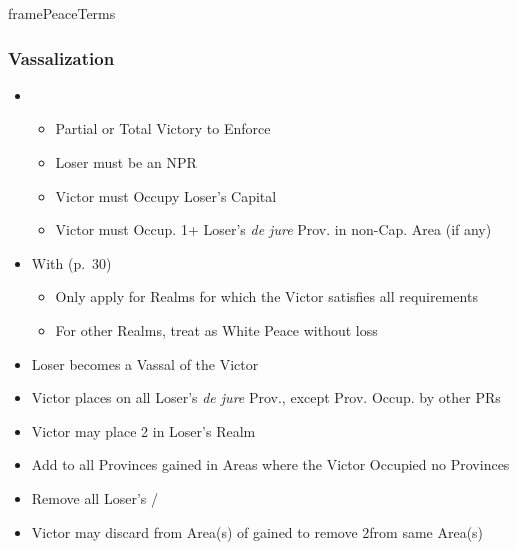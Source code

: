 \documentclass[10pt]{article}
\begin{document}
\begin{dynamiccontents*}{framePeaceTerms}
\begin{multicols}{3}
		\subsubsection*{Vassalization}
		\begin{itemize}
			\item {}
			\begin{itemize}
				\item Partial or Total Victory to Enforce
				\item Loser must be an NPR
				\item Victor must Occupy Loser's Capital
				\item Victor must Occup. 1+ Loser's \emph{de jure} Prov. in non-Cap. Area (if any)
			\end{itemize}
			\item With  (p.~30)
			\begin{itemize}
				\item Only apply for Realms for which the Victor satisfies all requirements
				\item For other Realms, treat as White Peace without \prestige loss
			\end{itemize}
			\item Loser becomes a Vassal of the Victor
			\item Victor places \vassalprovinces on all Loser's \emph{de jure} Prov., except Prov. Occup. by other PRs
			\item Victor may place 2 \influence in Loser's Realm
			\item Add \unrest to all Provinces gained in Areas where the Victor Occupied no Provinces
			\item Remove all Loser's \alliances/\marriages
			\item Victor may discard \claim from Area(s) of gained \vassalprovinces to remove 2\unrest from same Area(s)
		\end{itemize}


\end{multicols}
\end{dynamiccontents*}
\end{document}
